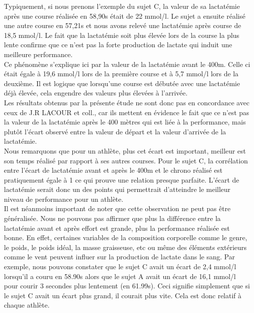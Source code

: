             Typiquement, si nous prenons l'exemple du sujet C, la valeur de sa lactatémie après une course réalisée en 58,90s était de 22 mmol/l. Le sujet a ensuite réalisé une autre course en 57,21s et nous avons relevé une lactatémie après course de 18,5 mmol/l. Le fait que la lactatémie soit plus élevée lors de la course la plus lente confirme que ce n'est pas la forte production de lactate qui induit une meilleure performance. \\
            
            Ce phénomène s'explique ici par la valeur de la lactatémie avant le 400m. Celle ci était égale à 19,6 mmol/l lors de la première course et à 5,7 mmol/l lors de la deuxième. Il est logique que lorsqu'une course est débutée avec une lactatémie déjà élevée, cela engendre des valeurs plus élevées à l'arrivée.\\
        
            Les résultats obtenus par la présente étude ne sont donc pas en concordance avec ceux de J.R LACOUR et coll., car ils mettent en évidence le fait que ce n'est pas la valeur de la lactatémie après le 400 mètres qui est liée à la performance, mais plutôt l'écart observé entre la valeur de départ et la valeur d'arrivée de la lactatémie.\\
        
            Nous remarquons que pour un athlète, plus cet écart est important, meilleur est son temps réalisé par rapport à ses autres courses. Pour le sujet C, la corrélation entre l'écart de lactatémie avant et après le 400m et le chrono réalisé est pratiquement égale à 1 ce qui prouve une relation presque parfaite. L'écart de lactatémie serait donc un des points qui permettrait d'atteindre le meilleur niveau de performance pour un athlète.\\
           
            Il est néanmoins important de noter que cette observation ne peut pas être généralisée. Nous ne pouvons pas affirmer que plus la différence entre la lactatémie avant et après effort est grande, plus la performance réalisée est bonne. En effet, certaines variables de la composition corporelle comme le genre, le poids, le poids idéal, la masse graisseuse, etc ou même des éléments extérieurs comme le vent peuvent influer sur la production de lactate dans le sang. Par exemple, nous pouvons constater que le sujet C avait un écart de 2,4 mmol/l lorsqu'il a couru en 58.90s alors que le sujet A avait un écart de 16,1 mmol/l pour courir 3 secondes plus lentement (en 61.99s). Ceci signifie simplement que si le sujet C avait un écart plus grand, il courait plus vite. Cela est donc relatif à chaque athlète.\\
            
